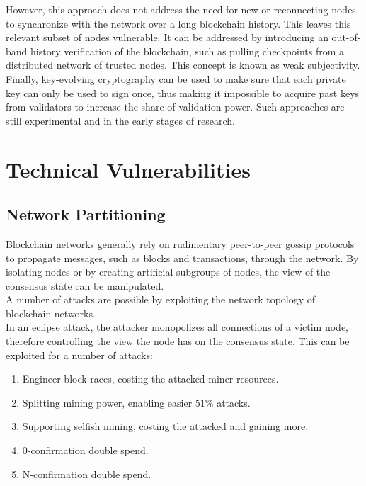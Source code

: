 \documentclass[11pt,a4paper]{article}
\begin{document}
However, this approach does not address the need for new or reconnecting nodes to synchronize with the network over a long blockchain history. This leaves this relevant subset of nodes vulnerable. It can be addressed by introducing an out-of-band history verification of the blockchain, such as pulling checkpoints from a distributed network of trusted nodes. This concept is known as weak subjectivity.\\

Finally, key-evolving cryptography can be used to make sure that each private key can only be used to sign once, thus making it impossible to acquire past keys from validators to increase the share of validation power. Such approaches are still experimental and in the early stages of research.\\

\section{Technical Vulnerabilities}

\subsection{Network Partitioning}

Blockchain networks generally rely on rudimentary peer-to-peer gossip protocols to propagate messages, such as blocks and transactions, through the network. By isolating nodes or by creating artificial subgroups of nodes, the view of the consensus state can be manipulated.\\

A number of attacks are possible by exploiting the network topology of blockchain networks.\\

In an eclipse attack, the attacker monopolizes all connections of a victim node, therefore controlling the view the node has on the consensus state. This can be exploited for a number of attacks:\\
\begin{enumerate}
  \item Engineer block races, costing the attacked miner resources.
  \item Splitting mining power, enabling easier 51\% attacks.
  \item Supporting selfish mining, costing the attacked and gaining more.
  \item 0-confirmation double spend.
  \item N-confirmation double spend.
\end{enumerate}
\end{document}
